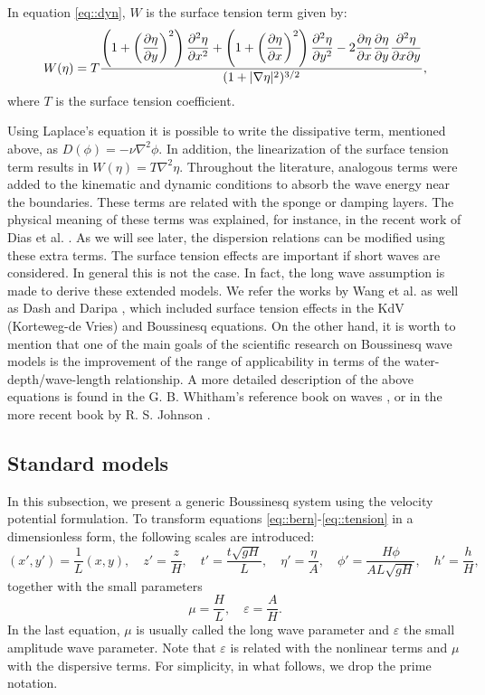 In equation \eqref{eq::dyn}, \(W\)  is the surface tension term given by: 
\begin{equation}\label{eq::tension}
 \displaystyle W(\eta)=T\frac{\displaystyle \left(1+\left(\frac{\partial \eta}{\partial y}\right)^2\right)\frac{\partial ^2\eta}{\partial x^2}+\left(1+\left(\frac{\partial \eta}{\partial x}\right)^2\right)\frac{\partial ^2\eta}{\partial y^2}
-2\frac{\partial \eta}{\partial x}\frac{\partial \eta}{\partial y}\frac{\partial ^2\eta}{\partial \displaystyle x\partial
y}}{(1+|\nabla\eta|^2)^{3/2}},
\end{equation}
where \(T\) is the surface tension coefficient.

Using  Laplace's equation it is possible to write the
dissipative term, mentioned above, as \(D(\phi)=-\nu\nabla^2\phi\). 
In addition,  the linearization of the surface tension term
results in \(W(\eta)=T\nabla^2\eta\).
Throughout the literature, analogous terms were
added to the kinematic and dynamic conditions to
absorb the wave energy near  the boundaries. 
These terms  are related
with  the sponge or damping layers.
The physical meaning   of  these terms
was  explained, for instance, in the recent  
work of Dias et al. \cite{DiaDya08}.
As we will see later, the dispersion relations can be
modified using these extra terms.    
The surface tension effects are important if short waves are considered.
In general this is not the case. 
In fact, the long wave assumption is made to derive  
these extended models.
 We refer the works by Wang et
al.  \cite{WanWu08} as well as  Dash and Daripa  \cite{DasDar02},
which included surface tension effects in the  KdV 
(Korteweg-de Vries) and Boussinesq equations.  
 On the other hand,  it is  worth to mention
that one of the main goals of the scientific research on Boussinesq
wave models is the  improvement  of the range of
applicability in terms of 
the water-depth/wave-length relationship.    
A more detailed description of the above equations is found
in the  G. B. Whitham's reference book on waves \cite{Whi74}, 
or in the more recent book  by R. S. Johnson \cite{Joh97}.



\subsection{Standard models}
In this subsection, we present  a generic  Boussinesq 
system  using the velocity potential formulation.
To transform 
equations \eqref{eq::bern}-\eqref{eq::tension} in a
dimensionless form, the following scales are 
introduced:
\begin{equation}
( x', y')=\frac{1}{L}(x,y),\quad 
z'=\frac{z}{H}, \quad  t'=\frac{t\sqrt{gH}}{L},\quad
 \eta'=\frac{\eta}{A},\quad  \phi'=
\frac{H\phi}{AL\sqrt{gH}},\quad h'=\frac{h}{H},
\end{equation}
together with the  small parameters
\begin{equation}
\mu=\frac{H}{L},\quad \varepsilon=\frac{A}{H}.
\end{equation}
In the last equation, \(\mu\) is usually called the 
long wave parameter  and \(\varepsilon\) the 
small amplitude wave parameter. 
Note that \(\varepsilon\)
is  related with the nonlinear terms and \(\mu\) with the
dispersive terms.
For simplicity, in what follows, we drop the prime notation.

